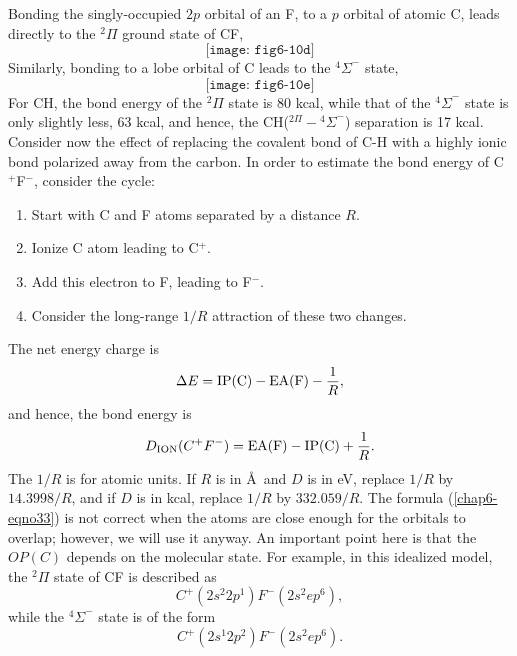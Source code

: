 Bonding the singly-occupied $2p$ orbital of an F, to a $p$ orbital of 
atomic C, leads directly to the ${^2\Pi}$ ground state of CF,
\begin{equation}
\texttt{[image: fig6-10d]}
\label{chap6-eqno32}
\end{equation}
Similarly, bonding to a lobe orbital of C leads to the ${^4\Sigma}^-$ 
state,
\begin{equation}
\texttt{[image: fig6-10e]}
\end{equation}
For CH, the bond energy of the ${^2\Pi}$ state is 80 kcal, while 
that of the ${^4\Sigma}^-$ state is only slightly less, 63 kcal, and 
hence, the CH($^{2\Pi} - {^4\Sigma}^-$) separation is 17 kcal.  
Consider now the effect of replacing the covalent bond of C-H with a 
highly ionic bond polarized away from the carbon.  In order to 
estimate the bond energy of C$^+$F$^-$, consider the cycle:
\begin{enumerate}
\item Start with C and F atoms separated by a distance $R$.  
\item Ionize C atom leading to C$^+$.  
\item Add this electron to F, leading to F$^-$.  
\item Consider the long-range $1/R$ attraction of these two 
changes.  
\end{enumerate}
The net energy charge is
\begin{equation}
\Delta E = \mathrm{IP(C)} - \mathrm{EA(F)} - {1 \over R},
\end{equation}
and hence, the bond energy is
\begin{equation}
D_\mathrm{ION} (C^+F^-) = \mathrm{EA(F)} - \mathrm{IP(C)} + {1 \over R}.
\label{chap6-eqno33}
\end{equation}
The $1/R$ is for atomic units.  If $R$ is in \AA\ and $D$ is in eV,
replace $1/R$ by $14.3998/R$, and if $D$ is in kcal, replace $1/R$ by
$332.059/R$.  The formula (\ref{chap6-eqno33}) is not correct when the
atoms are close enough for the orbitals to overlap; however, we will
use it anyway.  An important point here is that the $OP(C)$ depends on
the molecular state.  For example, in this idealized model, the
${^2\Pi}$ state of CF is described as
\begin{equation}
C^+ \left( 2s^2 2p^1 \right) F^- \left( 2s^2 ep^6 \right),
\end{equation}
while the ${^4\Sigma}^-$ state is of the form
\begin{equation}
C^+ \left( 2s^1 2p^2 \right) F^- \left( 2s^2 ep^6 \right).
\end{equation}
